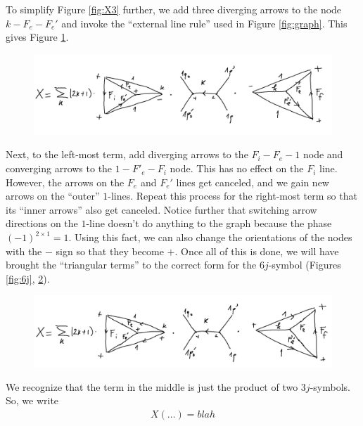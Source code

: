 \documentclass[11pt]{article}
\begin{document}
To simplify Figure \ref{fig:X3} further, we add three diverging arrows to the node $k-F_e-F_e'$ and invoke the ``external line rule'' used in Figure \ref{fig:graph}. This gives Figure \ref{fig:X4}.
\begin{figure}[!htb]
	\centering
	\includegraphics[scale=0.6]{draw_ang_4}
	\caption{}
	\label{fig:X4}
\end{figure}  
Next, to the left-most term, add diverging arrows to the $F_i-F_e-1$ node and converging arrows to the $1-F'_e-F_i$ node. This has no effect on the $F_i$ line. However, the arrows on the $F_e$ and $F_e'$ lines get canceled, and we gain new arrows on the ``outer'' $1$-lines. Repeat this process for the right-most term so that its ``inner arrows''  also get canceled. Notice further that switching arrow directions on the $1$-line doesn't do anything to the graph because the phase $(-1)^{2\times 1} = 1$. Using this fact, we can also change the orientations of the nodes with the $-$ sign so that they become $+$. Once all of this is done, we will have brought the ``triangular terms'' to the correct form for the $6j$-symbol (Figures \ref{fig:6j}, \ref{fig:X5}). 
\begin{figure}[!htb]
	\centering
	\includegraphics[scale=0.6]{draw_ang_5}
	\caption{}
	\label{fig:X5}
\end{figure} 
We recognize that the term in the middle is just the product of two $3j$-symbols. So, we write
\begin{align*}
X(\dots) = blah
\end{align*}





\end{document}
